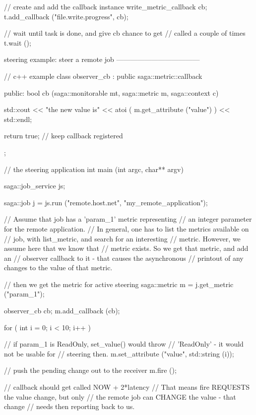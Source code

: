 \begin{mycode}
{      // create and add the callback instance
      write_metric_callback cb;
      t.add_callback ("file.write.progress", cb);
 
      // wait until task is done, and give cb chance to get
      // called a couple of times
      t.wait ();
    }
 
 
  steering example: steer a remote job
  ------------------------------------
 
    // c++ example
    class observer_cb : public saga::metric::callback
    {
      public:
        bool cb (saga::monitorable mt, 
                 saga::metric      m, 
                 saga::context     c)
        {
           std::cout << "the new value is"
                     << atoi ( m.get_attribute ("value") )
                     << std::endl;
 
           return true; // keep callback registered
        }
    };
 
    // the steering application
    int main (int argc, char** argv)
    {
      saga::job_service js;
 
      saga::job j = js.run ("remote.host.net",
                            "my_remote_application");
 
      // Assume that job has a 'param_1' metric representing
      // an integer parameter for the remote application.
      // In general, one has to list the metrics available on
      // job, with list_metric, and search for an interesting
      // metric.  However, we assume here that we know that
      // metric exists.  So we get that metric, and add an 
      // observer callback to it - that causes the asynchronous 
      // printout of any changes to the value of that metric.
 
      // then we get the metric for active steering
      saga::metric m = j.get_metric ("param_1");
 
      observer_cb cb;
      m.add_callback (cb);
 
      for ( int i = 0; i < 10; i++ )
      {
        // if param_1 is ReadOnly, set_value() would throw
        // 'ReadOnly' - it would not be usable for
        // steering then.
        m.set_attribute ("value", std::string (i));
 
        // push the pending change out to the receiver
        m.fire ();
 
        // callback should get called NOW + 2*latency
        // That means fire REQUESTS the value change, but only
        // the remote job can CHANGE the value - that change
        // needs then reporting back to us.
 
}}
\end{mycode}
